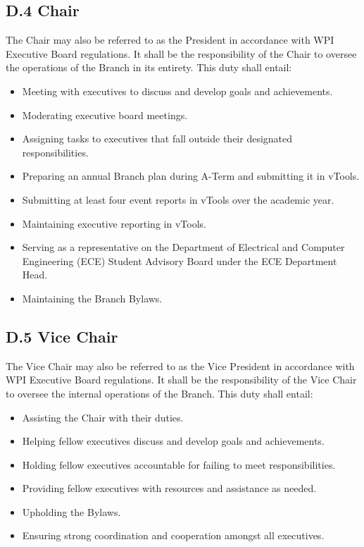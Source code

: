\documentclass[11pt,a4paper]{article}
\begin{document}
\subsection*{D.4 Chair}
The Chair may also be referred to as the President in accordance with WPI Executive Board regulations. It shall be the responsibility of the Chair to oversee the operations of the Branch in its entirety. This duty shall entail:
\begin{itemize}[noitemsep]
    \item Meeting with executives to discuss and develop goals and achievements.
    \item Moderating executive board meetings.
    \item Assigning tasks to executives that fall outside their designated responsibilities.
    \item Preparing an annual Branch plan during A-Term and submitting it in vTools.
    \item Submitting at least four event reports in vTools over the academic year.
    \item Maintaining executive reporting in vTools.
    \item Serving as a representative on the Department of Electrical and Computer Engineering (ECE) Student Advisory Board under the ECE Department Head.
    \item Maintaining the Branch Bylaws.
\end{itemize}

\subsection*{D.5 Vice Chair}
The Vice Chair may also be referred to as the Vice President in accordance with WPI Executive Board regulations. It shall be the responsibility of the Vice Chair to oversee the internal operations of the Branch. This duty shall entail:
\begin{itemize}[noitemsep]
    \item Assisting the Chair with their duties.
    \item Helping fellow executives discuss and develop goals and achievements.
    \item Holding fellow executives accountable for failing to meet responsibilities.
    \item Providing fellow executives with resources and assistance as needed.
    \item Upholding the Bylaws.
    \item Ensuring strong coordination and cooperation amongst all executives.
\end{itemize}
\end{document}
